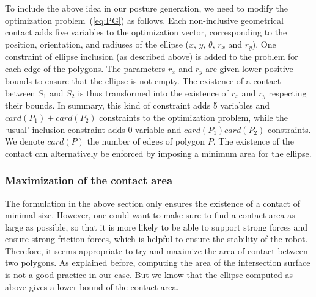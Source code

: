 
To include the above idea in our posture generation, we need to modify the optimization problem~(\ref{eq:PG}) as follows.
Each non-inclusive geometrical contact adds five variables to the optimization vector, corresponding to the position, orientation, and radiuses of the ellipse ($x$, $y$, $\theta$, $r_x$ and $r_y$).
One constraint of ellipse inclusion (as described above) is added to the problem for each edge of the polygons.
The parameters $r_x$ and $r_y$ are given lower positive bounds to ensure that the ellipse is not empty.
The existence of a contact between $S_1$ and $S_2$ is thus transformed into the existence of $r_x$ and $r_y$ respecting their bounds.
In summary, this kind of constraint adds 5 variables and $card(P_1)+card(P_2)$ constraints to the optimization problem, while the `usual' inclusion constraint adds 0 variable and $card(P_1)card(P_2)$ constraints.
We denote $card(P)$ the number of edges of polygon $P$.
The existence of the contact can alternatively be enforced by imposing a minimum area for the ellipse.



\subsubsection{Maximization of the contact area}
\label{subsubsec:optim-ellipse-area}


The formulation in the above section only ensures the existence of a contact of minimal size.
However, one could want to make sure to find a contact area as large as possible, so that it is more likely to be able to support strong forces and ensure strong friction forces, which is helpful to ensure the stability of the robot.
Therefore, it seems appropriate to try and maximize the area of contact between two polygons.
As explained before, computing the area of the intersection surface is not a good practice in our case.
But we know that the ellipse computed as above gives a lower bound of the contact area.

